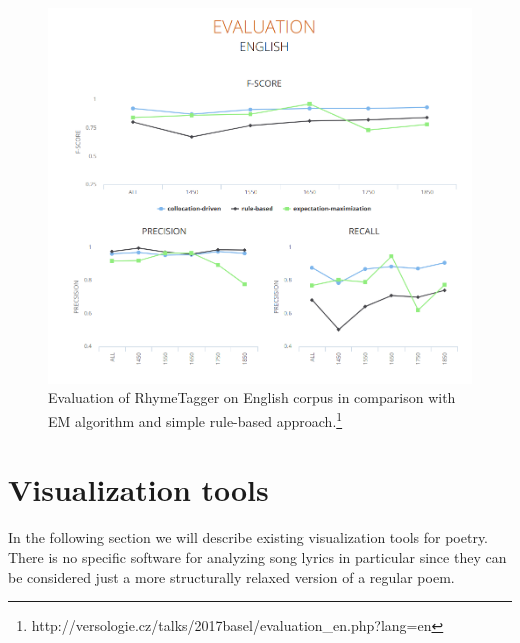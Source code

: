 \begin{figure}[h]\centering
	\includegraphics[scale=0.4]{../img/plechac_eval.png}
\caption{Evaluation of RhymeTagger on English corpus in comparison with EM algorithm and simple rule-based approach.\protect\footnote{http://versologie.cz/talks/2017basel/evaluation\_en.php?lang=en}}\label{screenshotRT}
\end{figure}


\section{Visualization tools}
In the following section we will describe existing visualization tools for poetry. There is no specific software for analyzing song lyrics in particular since they can be considered just a more structurally relaxed version of a regular poem.
